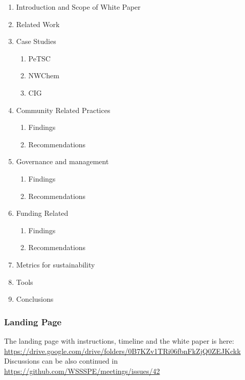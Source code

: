 \begin{enumerate}
\item Introduction and Scope of White Paper 
\item Related Work
\item Case Studies
\begin{enumerate} 
\item PeTSC
\item NWChem
\item CIG
\end{enumerate}
\item Community Related Practices
\begin{enumerate} 
\item Findings
\item Recommendations
\end{enumerate}
\item Governance and management
\begin{enumerate} 
\item Findings
\item Recommendations
\end{enumerate}
\item Funding Related
\begin{enumerate} 
\item Findings
\item Recommendations
\end{enumerate}
\item Metrics for sustainability
\item Tools
\item Conclusions
\end{enumerate}

\subsubsection{Landing Page}
The landing page with instructions, timeline and the white paper is here: \url{https://drive.google.com/drive/folders/0B7KZv1TRi06fbnFkZjQ0ZEJKckk}
Discussions can be also continued in \url{https://github.com/WSSSPE/meetings/issues/42}
